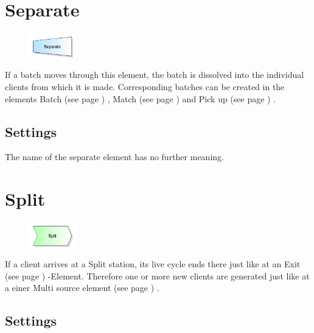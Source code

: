 \section{Separate}
\label{ref:ModelElementSeparate}

\begin{figure}
\vspace{-22pt}
\includegraphics[width=2cm]{imageModelElementSeparate.png}
\vspace{-22pt}
\end{figure}

If a batch moves through this element, the batch is dissolved into the individual clients from which it is made.
Corresponding batches can be created in the elements Batch (see page \pageref{ref:ModelElementBatch}) ,
Match (see page \pageref{ref:ModelElementMatch}) and Pick up (see page \pageref{ref:ModelElementPickUp}) .

\subsection*{Settings}

The name of the separate element has no further meaning.


\section{Split}
\label{ref:ModelElementSplit}

\begin{figure}
\vspace{-22pt}
\includegraphics[width=2cm]{imageModelElementSplit.png}
\vspace{-22pt}
\end{figure}

If a client arrives at a Split station, its live cycle ends there just like
at an  Exit (see page \pageref{ref:ModelElementDispose}) -Element.
Therefore one or more new clients are generated just like at a
einer Multi source element (see page \pageref{ref:ModelElementSourceMulti}) .

\subsection*{Settings}

